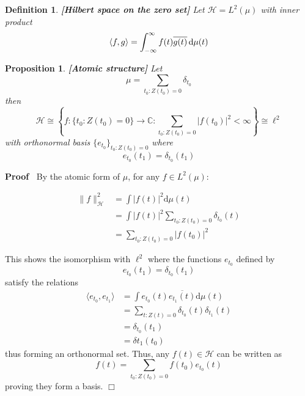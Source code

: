 \documentclass{article}
\newcommand{\mathd}{\mathrm{d}}
\newcommand{\tmstrong}[1]{\textbf{#1}}
\newenvironment{proof}{\noindent\textbf{Proof\ }}{\hspace*{\fill}$\Box$\medskip}
\newtheorem{definition}{Definition}
\newtheorem{proposition}{Proposition}
{\theorembodyfont{\rmfamily}\newtheorem{remark}{Remark}}
\begin{document}
\begin{definition}
  {\tmstrong{[Hilbert space on the zero set]\label{labeldef:Hmu}}} Let
  $\mathcal{H}= L^2 (\mu)$ with inner product
  \begin{equation}
    \langle f, g \rangle = \int_{- \infty}^{\infty} f (t) \overline{g (t)}
    \hspace{0.17em} \mathd \mu (t)
  \end{equation}
\end{definition}

\begin{proposition}
  {\tmstrong{[Atomic structure]\label{prop:atomic}}} Let
  \begin{equation}
    \mu = \sum_{t_0 : Z (t_0) = 0} \delta_{t_0}
  \end{equation}
  then
  \begin{equation}
    \mathcal{H} \cong \left\{ f : \{t_0 : Z (t_0) = 0\} \to \mathbb{C}:
    \sum_{t_0 : Z (t_0) = 0} |f (t_0) |^2 < \infty \right\} \cong \ell^2
  \end{equation}
  with orthonormal basis $\{e_{t_0} \}_{t_0 : Z (t_0) = 0}$ where
  \begin{equation}
    e_{t_0} (t_1) = \delta_{t_0 } (t_1)
  \end{equation}
\end{proposition}

\begin{proof}
  By the atomic form of $\mu$, for any $f \in L^2 (\mu)$:
  
  \begin{align}
    \|f\|_{\mathcal{H}}^2 & = \int |f (t) |^2 \mathd \mu (t) \\
    & = \int |f (t) |^2  \sum_{t_0 : Z (t_0) = 0} \delta_{t_0}  (t) \\
    & = \sum_{t_0 : Z (t_0) = 0} |f (t_0) |^2 
  \end{align}
  
  This shows the isomorphism with $\ell^2$ where the functions $e_{t_0}$
  defined by
  \begin{equation}
    e_{t_0} (t_1) = \delta_{t_0} (t_1)
  \end{equation}
  satisfy the relations
  \begin{equation}
    \begin{array}{ll}
      \langle e_{t_0}, e_{t_1} \rangle & = \int e_{t_0} (t) \overline{e_{t_1}
      (t)} \mathd \mu (t)\\
      & = \sum_{t : Z (t) = 0} \delta_{t_0 } (t) \delta_{t_1} (t)\\
      & = \delta_{{t_0} } (t_1)\\
      & = \delta t_1 (t_0)
    \end{array}
  \end{equation}
  thus forming an orthonormal set. Thus, any $f (t) \in \mathcal{H}$ can be
  written as
  \begin{equation}
    f (t) = \sum_{t_0 : Z (t_0) = 0} f (t_0) e_{t_0} (t)
  \end{equation}
  proving they form a basis.
\end{proof}
\end{document}

